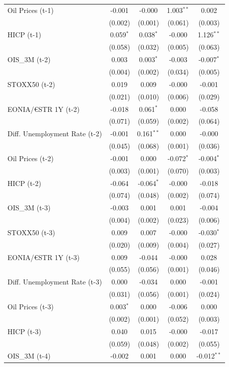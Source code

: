 \begin{longtable}[t]{lcccc}
Oil Prices (t-1) & -0.001 & -0.000 & 1.003$^{**}$ & 0.002\\
 & (0.002) & (0.001) & (0.061) & (0.003)\\
HICP (t-1) & 0.059$^{*}$ & 0.038$^{*}$ & -0.000 & 1.126$^{**}$\\
 & (0.058) & (0.032) & (0.005) & (0.063)\\
OIS\_3M (t-2) & 0.003 & 0.003$^{*}$ & -0.003 & -0.007$^{*}$\\
 & (0.004) & (0.002) & (0.034) & (0.005)\\
STOXX50 (t-2) & 0.019 & 0.009 & -0.000 & -0.001\\
 & (0.021) & (0.010) & (0.006) & (0.029)\\
EONIA/€STR 1Y (t-2) & -0.018 & 0.061$^{*}$ & 0.000 & -0.058\\
 & (0.071) & (0.059) & (0.002) & (0.064)\\
Diff. Unemployment Rate (t-2) & -0.001 & 0.161$^{**}$ & 0.000 & -0.000\\
 & (0.045) & (0.068) & (0.001) & (0.036)\\
Oil Prices (t-2) & -0.001 & 0.000 & -0.072$^{*}$ & -0.004$^{*}$\\
 & (0.003) & (0.001) & (0.070) & (0.003)\\
HICP (t-2) & -0.064 & -0.064$^{*}$ & -0.000 & -0.018\\
 & (0.074) & (0.048) & (0.002) & (0.074)\\
OIS\_3M (t-3) & -0.003 & 0.001 & 0.001 & -0.004\\
 & (0.004) & (0.002) & (0.023) & (0.006)\\
STOXX50 (t-3) & 0.009 & 0.007 & -0.000 & -0.030$^{*}$\\
 & (0.020) & (0.009) & (0.004) & (0.027)\\
EONIA/€STR 1Y (t-3) & 0.009 & -0.044 & -0.000 & 0.028\\
 & (0.055) & (0.056) & (0.001) & (0.046)\\
Diff. Unemployment Rate (t-3) & 0.000 & -0.034 & 0.000 & -0.001\\
 & (0.031) & (0.056) & (0.001) & (0.024)\\
Oil Prices (t-3) & 0.003$^{*}$ & 0.000 & -0.006 & 0.000\\
 & (0.002) & (0.001) & (0.052) & (0.003)\\
HICP (t-3) & 0.040 & 0.015 & -0.000 & -0.017\\
 & (0.059) & (0.048) & (0.002) & (0.055)\\
OIS\_3M (t-4) & -0.002 & 0.001 & 0.000 & -0.012$^{**}$\\

\end{longtable}

